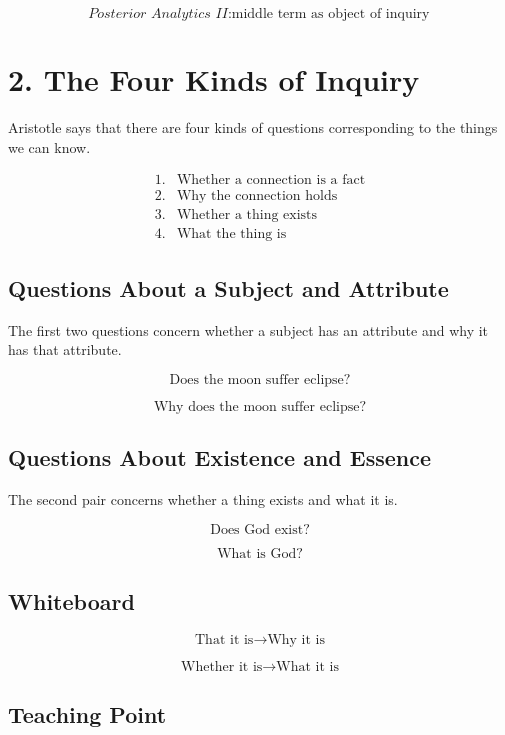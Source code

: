 \documentclass[12pt]{article}
\begin{document}
\[
\textit{Posterior Analytics II}: \text{middle term as object of inquiry}
\]

\section*{2. The Four Kinds of Inquiry}

Aristotle says that there are four kinds of questions corresponding to the
things we can know.

\[
\begin{array}{ll}
1. & \text{Whether a connection is a fact} \\
2. & \text{Why the connection holds} \\
3. & \text{Whether a thing exists} \\
4. & \text{What the thing is}
\end{array}
\]

\subsection*{Questions About a Subject and Attribute}

The first two questions concern whether a subject has an attribute and why it
has that attribute.

\[
\text{Does the moon suffer eclipse?}
\]

\[
\text{Why does the moon suffer eclipse?}
\]

\subsection*{Questions About Existence and Essence}

The second pair concerns whether a thing exists and what it is.

\[
\text{Does God exist?}
\]

\[
\text{What is God?}
\]

\subsection*{Whiteboard}

\[
\boxed{
\text{That it is} \rightarrow \text{Why it is}
}
\]

\[
\boxed{
\text{Whether it is} \rightarrow \text{What it is}
}
\]

\subsection*{Teaching Point}
\end{document}
